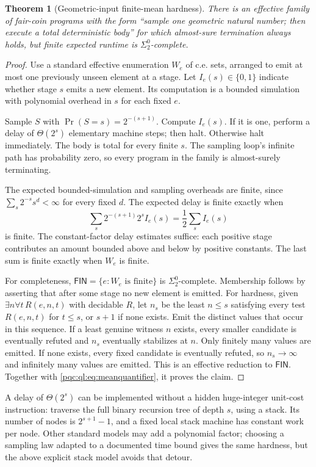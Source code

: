 \documentclass[11pt,letterpaper]{article}
\numberwithin{equation}{section}
\newtheorem{theorem}{Theorem}[section]
\theoremstyle{definition}
\theoremstyle{remark}
\newcommand{\sigtwo}{\Sigma^0_2}
\newcommand{\Bit}{\{0,1\}}
\newcommand{\Prob}{\Pr}
\newcommand{\FIN}{\ensuremath{\mathsf{FIN}}}
\begin{document}
\begin{theorem}[Geometric-input finite-mean hardness]\label{pqc:ql:thm:geometricmean}
There is an effective family of fair-coin programs with the form
``sample one geometric natural number; then execute a total deterministic
body'' for which almost-sure termination always holds, but finite expected
runtime is $\sigtwo$-complete.
\end{theorem}
\begin{proof}
Use a standard effective enumeration $W_e$ of c.e. sets, arranged to emit
at most one previously unseen element at a stage. Let $I_e(s)\in\Bit$
indicate whether stage $s$ emits a new element. Its computation is a
bounded simulation with polynomial overhead in $s$ for each fixed $e$.

Sample $S$ with $\Prob(S=s)=2^{-(s+1)}$. Compute $I_e(s)$. If it is one,
perform a delay of $\Theta(2^s)$ elementary machine steps; then halt.
Otherwise halt immediately. The body is total for every finite $s$.
The sampling loop's infinite path has probability zero, so every program
in the family is almost-surely terminating.

The expected bounded-simulation and sampling overheads are finite, since
$\sum_s2^{-s}s^d<\infty$ for every fixed $d$. The expected delay is finite
exactly when
\[
 \sum_s2^{-(s+1)}2^s I_e(s)=\frac12\sum_s I_e(s)
\]
is finite. The constant-factor delay estimates suffice: each positive
stage contributes an amount bounded above and below by positive constants.
The last sum is finite exactly when $W_e$ is finite.

For completeness, $\FIN=\{e:W_e\text{ is finite}\}$ is $\sigtwo$-complete.
Membership follows by asserting that after some stage no new element is
emitted. For hardness, given $\exists n\forall t\,R(e,n,t)$ with decidable
$R$, let $n_s$ be the least $n\le s$ satisfying every test $R(e,n,t)$ for
$t\le s$, or $s+1$ if none exists. Emit the distinct values that occur in
this sequence. If a least genuine witness $n$ exists, every smaller
candidate is eventually refuted and $n_s$ eventually stabilizes at $n$.
Only finitely many values are emitted. If none exists, every fixed
candidate is eventually refuted, so $n_s\to\infty$ and infinitely many
values are emitted. This is an effective reduction to $\FIN$.
Together with \eqref{pqc:ql:eq:meanquantifier}, it proves the claim.
\end{proof}

A delay of $\Theta(2^s)$ can be implemented without a hidden huge-integer
unit-cost instruction: traverse the full binary recursion tree of depth
$s$, using a stack. Its number of nodes is $2^{s+1}-1$, and a fixed local
stack machine has constant work per node. Other standard models may add
a polynomial factor; choosing a sampling law adapted to a documented
time bound gives the same hardness, but the above explicit stack model
avoids that detour.
\end{document}
